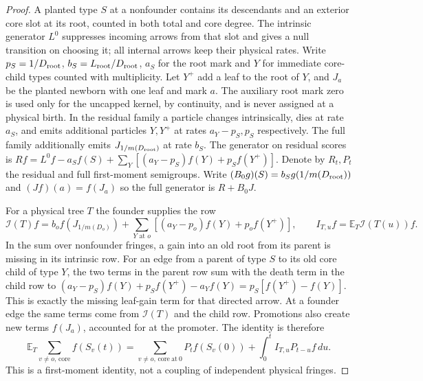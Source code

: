 \documentclass[11pt]{article}
\theoremstyle{remark}
\numberwithin{equation}{section}
\begin{document}
\begin{proof}
A planted type $S$ at a nonfounder contains its descendants and an exterior core slot at its root, counted in both total and core degree. The intrinsic generator $L^0$ suppresses incoming arrows from that slot and gives a null transition on choosing it; all internal arrows keep their physical rates. Write $p_S=1/D_{\rm root}$, $b_S=L_{\rm root}/D_{\rm root}$, $a_S$ for the root mark and $Y$ for immediate core-child types counted with multiplicity. Let $Y^+$ add a leaf to the root of $Y$, and $J_a$ be the planted newborn with one leaf and mark $a$. The auxiliary root mark zero is used only for the uncapped kernel, by continuity, and is never assigned at a physical birth. In the residual family a particle changes intrinsically, dies at rate $a_S$, and emits additional particles $Y,Y^+$ at rates $a_Y-p_S,p_S$ respectively. The full family additionally emits $J_{1/m(D_{\rm root})}$ at rate $b_S$. The generator on residual scores is $Rf=L^0f-a_Sf(S)+\sum_Y[(a_Y-p_S)f(Y)+p_Sf(Y^+)]$. Denote by $R_t,P_t$ the residual and full first-moment semigroups. Write $(B_0g)(S)=b_Sg(1/m(D_{\rm root}))$ and $(Jf)(a)=f(J_a)$ so the full generator is $R+B_0J$.

For a physical tree $T$ the founder supplies the row
\[
 \mathcal I(T)f=b_o f(J_{1/m(D_o)})+\sum_{Y\text{ at }o}[(a_Y-p_o)f(Y)+p_o f(Y^+)],
 \qquad I_{T,u}f=\mathbb E_T\mathcal I(T(u))f.
\]
In the sum over nonfounder fringes, a gain into an old root from its parent is missing in its intrinsic row. For an edge from a parent of type $S$ to its old core child of type $Y$, the two terms in the parent row sum with the death term in the child row to $(a_Y-p_S)f(Y)+p_Sf(Y^+)-a_Yf(Y)=p_S[f(Y^+)-f(Y)]$. This is exactly the missing leaf-gain term for that directed arrow. At a founder edge the same terms come from $\mathcal I(T)$ and the child row. Promotions also create new terms $f(J_a)$, accounted for at the promoter. The identity is therefore
\begin{equation}\label{eq:core-fringe-identity}
 \mathbb E_T\sum_{v\ne o,\,\mathrm{core}}f(S_v(t))
 =\sum_{v\ne o,\,\mathrm{core\ at\ }0}P_tf(S_v(0))+\int_0^t I_{T,u}P_{t-u}f\,du.
\end{equation}
This is a first-moment identity, not a coupling of independent physical fringes.


\end{proof}
\end{document}
